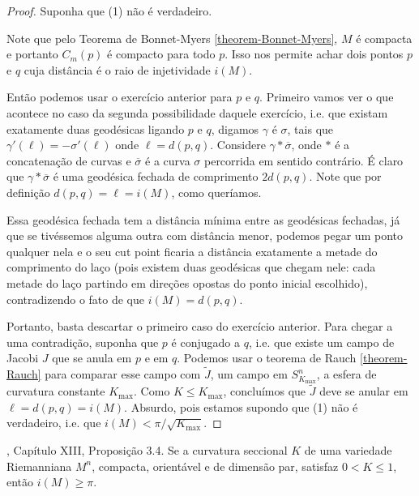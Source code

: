 \begin{proof}
Suponha que (1) não é verdadeiro. 

Note que pelo Teorema de Bonnet-Myers 
\ref{theorem-Bonnet-Myers}, $M$ é compacta e portanto $C_m(p)$ é compacto para
todo $p$. Isso nos permite achar dois pontos $p$ e $q$ cuja distância é o raio
de injetividade  $i(M)$.

Então podemos usar o exercício anterior para $p$ e $q$.  Primeiro vamos ver o
que acontece no caso da segunda possibilidade daquele exercício, i.e. que
existam exatamente duas geodésicas ligando $p$ e $q$, digamos $\gamma$ é
$\sigma$, tais que $\gamma'(\ell)=-\sigma'(\ell)$ onde $\ell=d(p,q)$.  Considere
$\gamma * \overline{\sigma}$, onde $*$ é a concatenação de curvas e 
$\overline{\sigma}$ é a curva $\sigma$ percorrida em sentido contrário. É claro
que $\gamma * \overline{\sigma}$ é uma geodésica fechada de comprimento $2
d(p,q)$. Note que por definição  $d(p,q)=\ell=i(M)$, como queríamos.

Essa geodésica fechada tem a distância mínima entre as geodésicas fechadas, já
que se tivéssemos alguma outra com distância menor, podemos pegar um ponto
qualquer nela e o seu cut point ficaria a distância exatamente a metade do
comprimento do laço (pois existem duas geodésicas que chegam nele: cada
metade do laço partindo em direções opostas do ponto inicial escolhido),
contradizendo o fato de que $i(M)=d(p,q)$.

Portanto, basta descartar o primeiro caso do exercício anterior. Para chegar a
 uma contradição, suponha que $p $ é conjugado a $q$, i.e. que existe um campo
 de Jacobi $J$ que se anula em $p$ e em $q$. Podemos usar o teorema de Rauch
\ref{theorem-Rauch} para comparar esse campo com $\tilde{J}$, 
um campo em $S^n_{K_{\text{max}}}$, a esfera de curvatura constante
 $K_{\text{max}}$. Como $K \leq  K_{\text{max}}$,
concluímos que $\tilde{J}$ deve se anular em $\ell=d(p,q)=i(M)$. Absurdo, pois
estamos supondo que (1) não é verdadeiro, i.e. que
 $i(M) < \pi/\sqrt{K_{\text{max}}}$.
\end{proof}

\begin{exercise}
\label{exercise-l8-3}
\cite{doc}, Capítulo XIII, Proposição 3.4. Se a curvatura seccional $K$ de uma
variedade Riemanniana $M^n$, compacta, orientável e de dimensão par, satisfaz 
$0<K \leq 1$, então $i(M) \geq \pi$.
\end{exercise}

